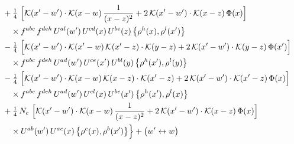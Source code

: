 \documentclass[10pt]{article}
\numberwithin{equation}{section}
\newcommand{\KK}{\mathcal K}
\begin{document}
\begin{align}
&\quad +\tfrac14\,\,\Big[\KK(x'-w')\cdot\KK(x-w)\,\frac{1}{(x-z)^2}+2\,\KK(x'-w')\cdot\KK(x-z)\,\Phi(x)\Big]\notag\\
&\qquad\times f^{abc}\,f^{deh}\,U^{al}(w')\,U^{cd}(x)\,U^{be}(z)\,\big\{\rho^{h}(x),\rho^{l}(x')\big\}\notag\\
&\quad -\tfrac14\,\,\Big[\KK(x'-w')\cdot\KK(x'-w)\,\KK(x'-z)\cdot\KK(y-z)+2\,\KK(x'-w')\cdot\KK(y-z)\,\Phi(x')\Big]\notag\\
&\qquad\times f^{abc}\,f^{deh}\,U^{ad}(w')\,U^{ce}(x')\,U^{bl}(y)\,\big\{\rho^{h}(x'),\rho^{l}(y)\big\}\notag\\
&\quad -\tfrac14\,\,\Big[\KK(x'-w')\cdot\KK(x-w)\,\KK(x-z)\cdot\KK(x'-z)+2\,\KK(x'-w')\cdot\KK(x'-z)\,\Phi(x)\Big]\notag\\
&\qquad\times f^{abc}\,f^{deh}\,U^{ad}(w')\,U^{cl}(x)\,U^{be}(x')\,\big\{\rho^{h}(x'),\rho^{l}(x)\big\}\notag\\
&\quad +\tfrac14\,N_{c}\,\,\Big[\KK(x'-w')\cdot\KK(x-w)\,\frac{1}{(x-z)^2}+2\,\KK(x'-w')\cdot\KK(x-z)\,\Phi(x)\Big]\notag\\
&\qquad\times U^{ab}(w')\,U^{ac}(x)\,\big\{\rho^{c}(x),\rho^{b}(x')\big\}\Big\}+\big(w'\leftrightarrow w\big)\label{R:eq:sum-GI.III}
\end{align}
\end{document}
